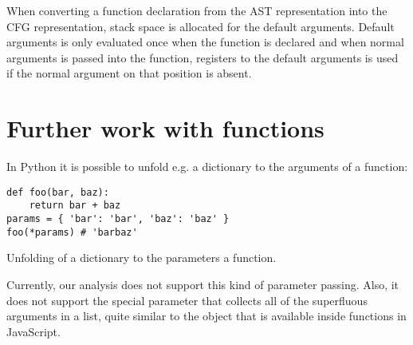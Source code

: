 When converting a function declaration from the AST representation into the CFG representation, stack space is allocated for the default arguments. Default arguments is only evaluated once when the function is declared and when normal arguments is passed into the function, registers to the default arguments is used if the normal argument on that position is absent.

\section{Further work with functions}
In Python it is possible to unfold e.g. a dictionary to the arguments of a function:

\begin{listing}[H]
	\begin{verbatim}
def foo(bar, baz):
	return bar + baz
params = { 'bar': 'bar', 'baz': 'baz' }
foo(*params) # 'barbaz'
	\end{verbatim}
\caption{Unfolding of a dictionary to the parameters a function.}\label{code:UnfoldDictFunctionExample}
\end{listing}

Currently, our analysis does not support this kind of parameter passing. Also, it does not support the special  parameter that collects all of the superfluous arguments in a list, quite similar to the  object that is available inside functions in JavaScript.

